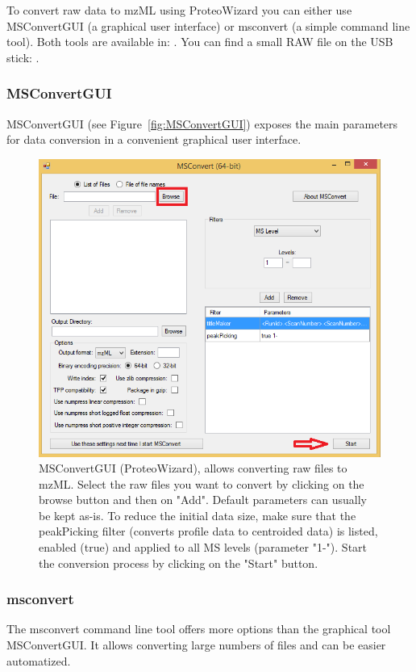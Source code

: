 To convert raw data to mzML using ProteoWizard you can either use MSConvertGUI (a graphical user interface) or msconvert (a simple command line tool). Both tools are available in:
\newline
\directory{\WindowsDefaultPWizFolder}.
You can find a small RAW file on the USB stick:
.

\subsubsection{MSConvertGUI}
MSConvertGUI (see Figure~\ref{fig:MSConvertGUI}) exposes the main parameters for data conversion in a convenient graphical user interface.

\begin{figure}
\centering
\includegraphics[width=12cm]{graphics/introduction/proteowizard.png}
\caption{MSConvertGUI (ProteoWizard), allows converting raw files to mzML. Select the raw files you want to convert by clicking on the browse button and then on "Add". Default parameters can usually be kept as-is. To reduce the initial data size, make sure that the peakPicking filter (converts profile data to centroided data) is listed, enabled (true) and applied to all MS levels (parameter "1-"). Start the conversion process by clicking on the "Start" button.}
\label{fig:proteowizard}
\end{figure}

\subsubsection{msconvert}
The msconvert command line tool offers more options than the graphical tool MSConvertGUI. It allows converting large numbers of files and can be easier automatized.

